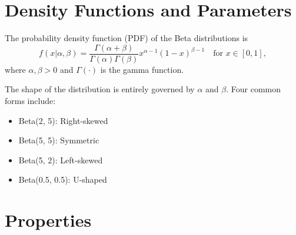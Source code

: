 \documentclass{article}\usepackage[]{graphicx}\usepackage[]{xcolor}
\begin{document}
\begin{multicols}{2}
% 
% 

\section{Density Functions and Parameters}

The probability density function (PDF) of the Beta distributions is 
\begin{equation*}
f(x|\alpha, \beta) = \frac{\Gamma(\alpha + \beta)}{\Gamma(\alpha)\Gamma(\beta)} x^{\alpha - 1}(1 - x)^{\beta - 1} \quad \text{for } x \in [0, 1],
\end{equation*}
where $\alpha, \beta > 0$ and $\Gamma(\cdot)$ is the gamma function.

The shape of the distribution is entirely governed by $\alpha$ and $\beta$. Four common forms include: 
\begin{itemize}
\item Beta(2, 5): Right-skewed
\item Beta(5, 5): Symmetric
\item Beta(5, 2): Left-skewed
\item Beta(0.5, 0.5): U-shaped
\end{itemize}




\section{Properties}


\end{multicols}
\end{document}
